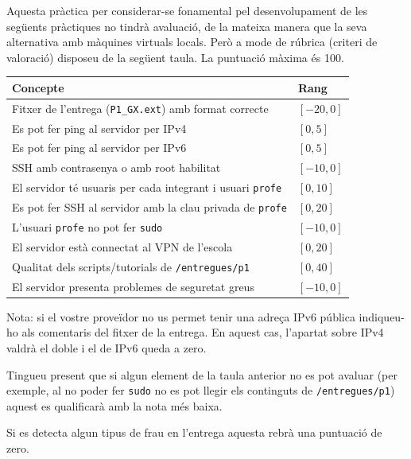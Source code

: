 \documentclass{practicaitic}
\begin{document}
Aquesta pràctica per considerar-se fonamental pel desenvolupament de
les següents pràctiques no tindrà avaluació, de la mateixa manera que
la seva alternativa amb màquines virtuals locals. Però a mode de
rúbrica (criteri de valoració) disposeu de la següent taula. La
puntuació màxima és 100.

\begin{center}
  \begin{tabular}{ll}
  \hline
  Concepte & Rang \\ \hline
  Fitxer de l'entrega (\texttt{P1\_GX.ext}) amb format correcte & $[-20, 0]$ \\
  Es pot fer ping al servidor per IPv4 & $[0, 5]$ \\
  Es pot fer ping al servidor per IPv6 & $[0, 5]$ \\
  SSH amb contrasenya o amb root habilitat & $[-10, 0]$ \\
  El servidor té usuaris per cada integrant i usuari \texttt{profe} & $[0, 10]$ \\
  Es pot fer SSH al servidor amb la clau privada de \texttt{profe} & $[0, 20]$ \\
  L'usuari \texttt{profe} no pot fer \texttt{sudo} & $[-10,0]$ \\
  El servidor està connectat al VPN de l'escola & $[0, 20]$ \\
  Qualitat dels scripts/tutorials de \texttt{/entregues/p1} & $[0,40]$ \\
  El servidor presenta problemes de seguretat greus & $[-10,0]$ \\
  \hline
  \end{tabular}
\end{center}

Nota: si el vostre proveïdor no us permet tenir una adreça IPv6 pública
indiqueu-ho als comentaris del fitxer de la entrega. En aquest cas, l'apartat
sobre IPv4 valdrà el doble i el de IPv6 queda a zero.

Tingueu present que si algun element de la taula anterior no es pot avaluar
(per exemple, al no poder fer \texttt{sudo} no es pot llegir els continguts de \texttt{/entregues/p1})
aquest es qualificarà amb la nota més baixa.

Si es detecta algun tipus de frau en l'entrega aquesta rebrà una puntuació de zero.
\end{document}
